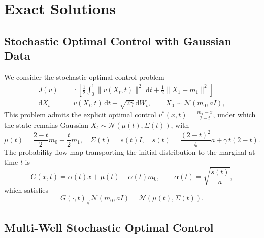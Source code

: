 \documentclass[preprint]{elsarticle}
\newcommand{\rd}{\mathrm{d}}
\newcommand{\dd}{\,\mathrm{d}}          \newcommand{\pdv}[2]{\dfrac{\partial #1}{\partial #2}}
\begin{document}
\section{Exact Solutions}\label{sec:appendix_exact_sol}

\subsection{Stochastic Optimal Control with Gaussian Data}
\label{sec:appendix_soc}

We consider the stochastic optimal control problem
\begin{align*}
J(v)
&=
\mathbb E\!\left[
\frac12\int_0^1\|v(X_t,t)\|^2\,\dd t
+
\frac12\|X_1-m_1\|^2
\right]\\
\rd X_t&=v(X_t,t)\,\rd t+\sqrt{2\gamma}\,\rd W_t,
\qquad
X_0\sim\mathcal N(m_0,aI),
\end{align*}
This problem admits the explicit optimal control $v^*(x,t)=\frac{m_1-x}{2-t}$, under which the state remains Gaussian $X_t\sim\mathcal N(\mu(t),\Sigma(t))$, with
\[
\mu(t)=\frac{2-t}{2}m_0+\frac{t}{2}m_1,\quad
\Sigma(t)=s(t)I,\quad s(t)=\frac{(2-t)^2}{4}a+\gamma\,t(2-t).
\]
The probability-flow map transporting the initial distribution to the marginal at time \(t\) is
\[
G(x,t)
=
\alpha(t)x
+
\mu(t)
-
\alpha(t)m_0,
\qquad
\alpha(t)
=
\sqrt{\frac{s(t)}{a}},
\]
which satisfies
\[
G(\cdot,t)_\#\mathcal N(m_0,aI)
=
\mathcal N(\mu(t),\Sigma(t)).
\]

\subsection{Multi-Well Stochastic Optimal Control}\label{sec:appendix_soc_mw}
\end{document}
